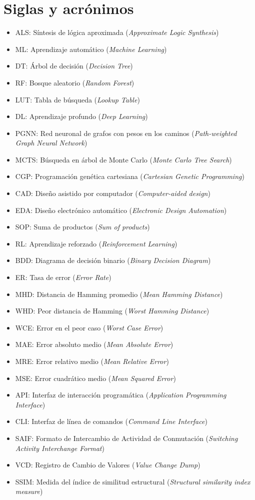 \chapter*{Siglas y acrónimos}

\begin{itemize}
  \item ALS: Síntesis de lógica aproximada (\emph{Approximate Logic Synthesis})
  \item ML: Aprendizaje automático (\emph{Machine Learning})
  \item DT: Árbol de decisión (\emph{Decision Tree})
  \item RF: Bosque aleatorio (\emph{Random Forest})
  \item LUT: Tabla de búsqueda (\emph{Lookup Table})
  \item DL: Aprendizaje profundo (\emph{Deep Learning})
  \item PGNN: Red neuronal de grafos con pesos en los caminos (\emph{Path-weighted Graph Neural Network})
  \item MCTS: Búsqueda en árbol de Monte Carlo (\emph{Monte Carlo Tree Search})
  \item CGP: Programación genética cartesiana (\emph{Cartesian Genetic Programming})
  \item CAD: Diseño asistido por computador (\emph{Computer-aided design})
  \item EDA: Diseño electrónico automático (\emph{Electronic Design Automation})
  \item SOP: Suma de productos (\emph{Sum of products})
  \item RL: Aprendizaje reforzado (\emph{Reinforcement Learning})
  \item BDD: Diagrama de decisión binario (\emph{Binary Decision Diagram})
  \item ER: Tasa de error (\emph{Error Rate})
  \item MHD: Distancia de Hamming promedio (\emph{Mean Hamming Distance})
  \item WHD: Peor distancia de Hamming (\emph{Worst Hamming Distance})
  \item WCE: Error en el peor caso (\emph{Worst Case Error})
  \item MAE: Error absoluto medio (\emph{Mean Absolute Error})
  \item MRE: Error relativo medio (\emph{Mean Relative Error})
  \item MSE: Error cuadrático medio (\emph{Mean Squared Error})
  \item API: Interfaz de interacción programática (\emph{Application Programming Interface})
  \item CLI: Interfaz de línea de comandos (\emph{Command Line Interface})
  \item SAIF: Formato de Intercambio de Actividad de Conmutación (\emph{Switching Activity Interchange Format})
  \item VCD: Registro de Cambio de Valores (\emph{Value Change Dump})
  \item SSIM: Medida del índice de similitud estructural (\emph{Structural similarity index measure})
\end{itemize}
